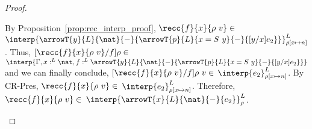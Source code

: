 \begin{proof}
\begin{itemize}
  By Proposition~\ref{prop:rec_interp_proof}, $\recc{f}{x}{\rho\ v}
  \in $ $\interp{\arrowT{y}{L}{\nat}{-}{\arrowT{p}{L}{x =
  S\ y}{-}{[y/x]e_2}}}^L_{\rho[x \mapsto n]}$.  Thus,
  $[\recc{f}{x}{\rho\ v}/f]\rho \in $ $\interp{\Gamma,x:^L
  \nat,f:^L \arrowT{y}{L}{\nat}{-}{\arrowT{p}{L}{x =
  S\ y}{-}{[y/x]e_2}}}$ and we can finally conclude,
  $[\recc{f}{x}{\rho\ v}/f]\rho\ v \in $
  $\interp{e_2}^L_{\rho[x \mapsto n]}$.  By
  CR-Pres, $\recc{f}{x}{\rho\ v} \in $ $\interp{e_2}^L_{\rho[x \mapsto n]}$.  Therefore,
  $\recc{f}{x}{\rho\ v} \in $
  $\interp{\arrowT{x}{L}{\nat}{-}{e_2}}^L_\rho$.
\end{itemize}
\end{proof}


